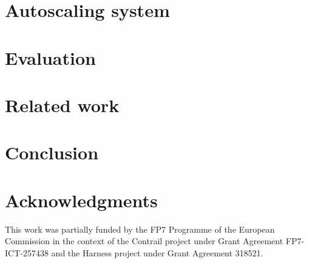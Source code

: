 \documentclass{sig-alternate-10pt}
\begin{document}

%


\section{Autoscaling system}
\label{sec:proposed_approach}



\section{Evaluation}
\label{sec:evaluation}


\section{Related work}
\label{sec:relatedWorks}



\section{Conclusion}
\label{sec:conclusion}


\section{Acknowledgments}

This work was partially funded by the FP7 Programme of the European
Commission in the context of the Contrail project under Grant
Agreement FP7-ICT-257438 and the Harness project under Grant Agreement
318521.

\balancecolumns



\end{document}
